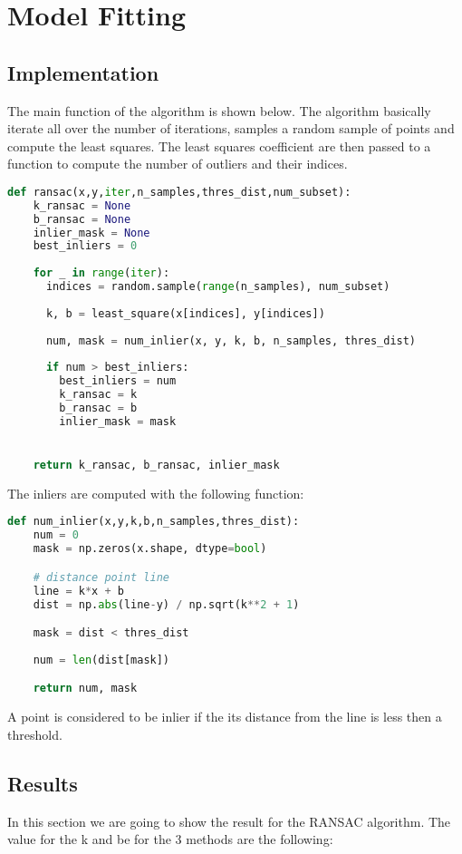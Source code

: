 \documentclass{ETHExercise}
\begin{document}
\newpage
\section{Model Fitting}

\subsection{Implementation}

The main function of the algorithm is shown below. The algorithm
basically iterate all over the number of iterations, samples a random sample of
points and compute the least squares. The least squares coefficient are then 
passed to a function to compute the number of outliers and their indices.
\begin{lstlisting}[language=Python, caption=RANSAC]
  def ransac(x,y,iter,n_samples,thres_dist,num_subset):
    k_ransac = None
    b_ransac = None
    inlier_mask = None
    best_inliers = 0
  
    for _ in range(iter):
      indices = random.sample(range(n_samples), num_subset)
    
      k, b = least_square(x[indices], y[indices])
    
      num, mask = num_inlier(x, y, k, b, n_samples, thres_dist)
      
      if num > best_inliers:
        best_inliers = num
        k_ransac = k
        b_ransac = b
        inlier_mask = mask


    return k_ransac, b_ransac, inlier_mask
\end{lstlisting}

The inliers are computed with the following function:
\begin{lstlisting}[language=Python, caption=num\_inlier]
  def num_inlier(x,y,k,b,n_samples,thres_dist):
    num = 0
    mask = np.zeros(x.shape, dtype=bool)

    # distance point line
    line = k*x + b
    dist = np.abs(line-y) / np.sqrt(k**2 + 1)

    mask = dist < thres_dist
  
    num = len(dist[mask])

    return num, mask
\end{lstlisting}
A point is considered to be inlier if the its distance from the line is less then a threshold.


\subsection{Results}
In this section we are going to show the result for the RANSAC algorithm.
The value for the k and be for the 3 methods are the following:
\end{document}
